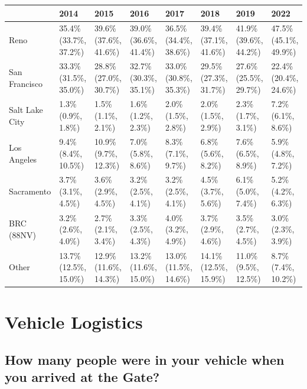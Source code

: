 \documentclass[
]{book}
\begin{document}
\begin{table}
\centering
\begin{tabular}[t]{>{}l|>{}l|>{}l|>{}l|>{}l|>{}l|>{}l|>{}l}
\hline
  & 2014 & 2015 & 2016 & 2017 & 2018 & 2019 & 2022\\
\hline
Reno & 35.4\% (33.7\%, 37.2\%) & 39.6\% (37.6\%, 41.6\%) & 39.0\% (36.6\%, 41.4\%) & 36.5\% (34.4\%, 38.6\%) & 39.4\% (37.1\%, 41.6\%) & 41.9\% (39.6\%, 44.2\%) & 47.5\% (45.1\%, 49.9\%)\\
\hline
San Francisco & 33.3\% (31.5\%, 35.0\%) & 28.8\% (27.0\%, 30.7\%) & 32.7\% (30.3\%, 35.1\%) & 33.0\% (30.8\%, 35.3\%) & 29.5\% (27.3\%, 31.7\%) & 27.6\% (25.5\%, 29.7\%) & 22.4\% (20.4\%, 24.6\%)\\
\hline
Salt Lake City & 1.3\% (0.9\%, 1.8\%) & 1.5\% (1.1\%, 2.1\%) & 1.6\% (1.2\%, 2.3\%) & 2.0\% (1.5\%, 2.8\%) & 2.0\% (1.5\%, 2.9\%) & 2.3\% (1.7\%, 3.1\%) & 7.2\% (6.1\%, 8.6\%)\\
\hline
Los Angeles & 9.4\% (8.4\%, 10.5\%) & 10.9\% (9.7\%, 12.3\%) & 7.0\% (5.8\%, 8.6\%) & 8.3\% (7.1\%, 9.7\%) & 6.8\% (5.6\%, 8.2\%) & 7.6\% (6.5\%, 8.9\%) & 5.9\% (4.8\%, 7.2\%)\\
\hline
Sacramento & 3.7\% (3.1\%, 4.5\%) & 3.6\% (2.9\%, 4.5\%) & 3.2\% (2.5\%, 4.1\%) & 3.2\% (2.5\%, 4.1\%) & 4.5\% (3.7\%, 5.6\%) & 6.1\% (5.0\%, 7.4\%) & 5.2\% (4.2\%, 6.3\%)\\
\hline
BRC (88NV) & 3.2\% (2.6\%, 4.0\%) & 2.7\% (2.1\%, 3.4\%) & 3.3\% (2.5\%, 4.3\%) & 4.0\% (3.2\%, 4.9\%) & 3.7\% (2.9\%, 4.6\%) & 3.5\% (2.7\%, 4.5\%) & 3.0\% (2.3\%, 3.9\%)\\
\hline
Other & 13.7\% (12.5\%, 15.0\%) & 12.9\% (11.6\%, 14.3\%) & 13.2\% (11.6\%, 15.0\%) & 13.0\% (11.5\%, 14.6\%) & 14.1\% (12.5\%, 15.9\%) & 11.0\% (9.5\%, 12.5\%) & 8.7\% (7.4\%, 10.2\%)\\
\hline
\end{tabular}
\end{table}

\hypertarget{vehicle-logistics}{%
\section{Vehicle Logistics}\label{vehicle-logistics}}

\hypertarget{how-many-people-were-in-your-vehicle-when-you-arrived-at-the-gate}{%
\subsection{How many people were in your vehicle when you arrived at the Gate?}\label{how-many-people-were-in-your-vehicle-when-you-arrived-at-the-gate}}
\end{document}
